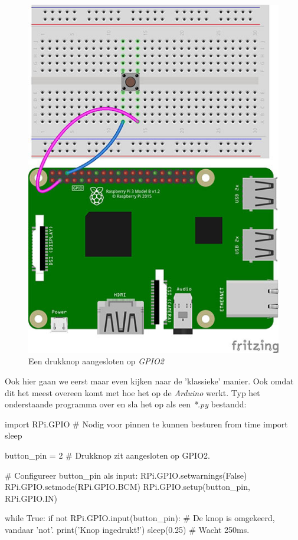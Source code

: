 \begin{figure}[h!]
\centering\includegraphics[scale=0.45]{Pictures/chapter05/pi_button_01.jpg}
\caption{Een drukknop aangesloten op \textit{GPIO2}}
\label{fig:pi_button} %
\end{figure}

Ook hier gaan we eerst maar even kijken naar de 'klassieke' manier. Ook omdat dit het meest overeen komt met hoe het op de \textit{Arduino} werkt. Typ het onderstaande programma over en sla het op als een \textit{*.py} bestandd:
\begin{python}
import RPi.GPIO  # Nodig voor pinnen te kunnen besturen
from time import sleep

button_pin = 2  # Drukknop zit aangesloten op GPIO2.

# Configureer button_pin als input:
RPi.GPIO.setwarnings(False)
RPi.GPIO.setmode(RPi.GPIO.BCM)
RPi.GPIO.setup(button_pin, RPi.GPIO.IN)

while True:
    if not RPi.GPIO.input(button_pin):  # De knop is omgekeerd, vandaar 'not'.
        print('Knop ingedrukt!')
        sleep(0.25)                     # Wacht 250ms.
\end{python}


